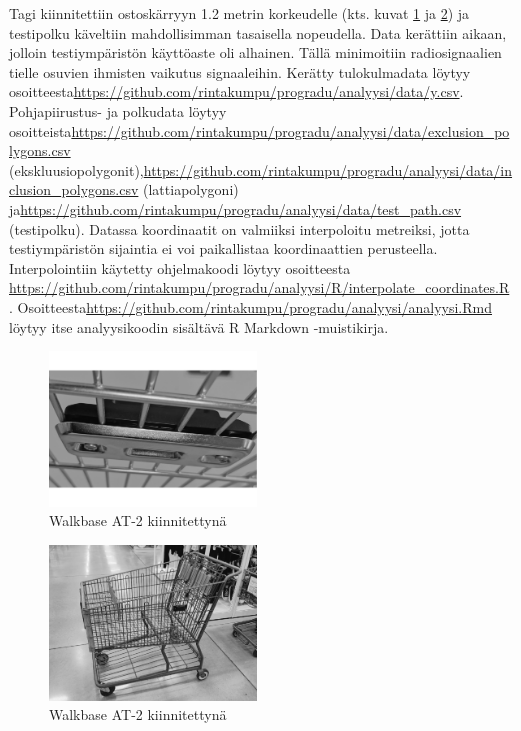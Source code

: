 \documentclass[
  12pt,
  a4paper, twoside]{book}
\begin{document}
\noindent Tagi kiinnitettiin ostoskärryyn 1.2 metrin korkeudelle (kts. kuvat \ref{fig:at2_cart} ja \ref{fig:at2_cart2}) ja testipolku käveltiin mahdollisimman tasaisella nopeudella. Data kerättiin aikaan, jolloin testiympäristön käyttöaste oli alhainen. Tällä minimoitiin radiosignaalien tielle osuvien ihmisten vaikutus signaaleihin. Kerätty tulokulmadata löytyy osoitteesta\newline \url{https://github.com/rintakumpu/progradu/analyysi/data/y.csv}. Pohjapiirustus- ja polkudata löytyy osoitteista\newline \url{https://github.com/rintakumpu/progradu/analyysi/data/exclusion_polygons.csv} (ekskluusiopolygonit),\newline \url{https://github.com/rintakumpu/progradu/analyysi/data/inclusion_polygons.csv} (lattiapolygoni) ja\newline \url{https://github.com/rintakumpu/progradu/analyysi/data/test_path.csv} (testipolku). Datassa koordinaatit on valmiiksi interpoloitu metreiksi, jotta testiympäristön sijaintia ei voi paikallistaa koordinaattien perusteella. Interpolointiin käytetty ohjelmakoodi löytyy osoitteesta \newline \url{https://github.com/rintakumpu/progradu/analyysi/R/interpolate_coordinates.R} . Osoitteesta\newline \url{https://github.com/rintakumpu/progradu/analyysi/analyysi.Rmd} löytyy itse analyysikoodin sisältävä R Markdown -muistikirja.

\begin{multicols}{2}
\begin{figure}[H]
\centering
\includegraphics[width=5.5cm]{at_2_cart}
\caption{Walkbase AT-2 kiinnitettynä}
\label{fig:at2_cart}
\end{figure}

\begin{figure}[H]
\centering
\includegraphics[width=5.5cm]{at_2_cart2}
\caption{Walkbase AT-2 kiinnitettynä}
\label{fig:at2_cart2}
\end{figure}
\end{multicols}
\end{document}
